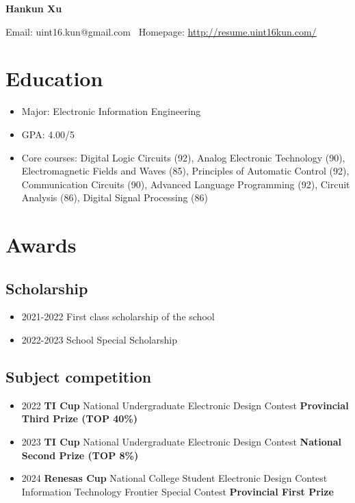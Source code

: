 \documentclass{article}
\begin{document}
\begin{center}
    \textbf{\Large Hankun Xu}
\end{center}

\begin{center}
    Email: uint16.kun@gmail.com \textbar \  Homepage: \href{http://resume.uint16kun.com/}{http://resume.uint16kun.com/}
\end{center}

\section*{Education}
\begin{itemize}
    \item Major: Electronic Information Engineering
    \item GPA: 4.00/5
    \item Core courses: Digital Logic Circuits (92), Analog Electronic Technology (90), Electromagnetic Fields and Waves (85), Principles of Automatic Control (92), Communication Circuits (90), Advanced Language Programming (92), Circuit Analysis (86), Digital Signal Processing (86)
\end{itemize}

\section*{Awards}
\subsection*{Scholarship}
\begin{itemize}
    \item 2021-2022 First class scholarship of the school
    \item 2022-2023 School Special Scholarship
\end{itemize}

\subsection*{Subject competition}
\begin{itemize}
    \item 2022 \textbf{TI Cup} National Undergraduate Electronic Design Contest \textbf{Provincial Third Prize (TOP 40\%)}
    \item 2023 \textbf{TI Cup} National Undergraduate Electronic Design Contest \textbf{National Second Prize (TOP 8\%)}
    \item 2024 \textbf{Renesas Cup} National College Student Electronic Design Contest Information Technology Frontier Special Contest \textbf{Provincial First Prize}
\end{itemize}
\end{document}
